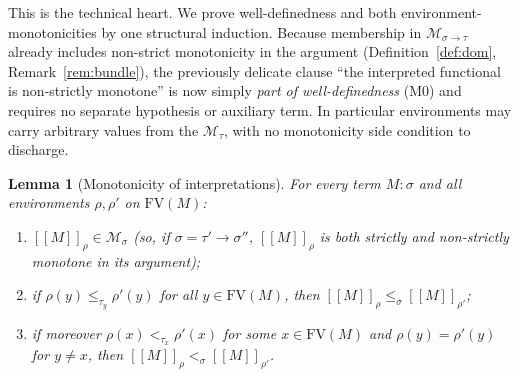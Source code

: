 \documentclass{amsart}
\newtheorem{lemma}{Lemma}
\theoremstyle{definition}
\newcommand{\interp}[1]{[\![#1]\!]}
\newcommand{\FV}{\mathrm{FV}}
\begin{document}
This is the technical heart. We prove well-definedness and both environment-monotonicities
by one structural induction. Because membership in $\mathcal M_{\sigma\to\tau}$ already
includes non-strict monotonicity in the argument (Definition~\ref{def:dom},
Remark~\ref{rem:bundle}), the previously delicate clause ``the interpreted functional is
non-strictly monotone'' is now simply \emph{part of well-definedness} (M0) and requires no
separate hypothesis or auxiliary term. In particular environments may carry arbitrary
values from the $\mathcal M_\tau$, with no monotonicity side condition to discharge.

\begin{lemma}[Monotonicity of interpretations]\label{lem:official}
For every term $M:\sigma$ and all environments $\rho,\rho'$ on $\FV(M)$:
\begin{enumerate}
\item[\textup{(M0)}] $\interp{M}_\rho\in\mathcal M_\sigma$ \emph{(}so, if
  $\sigma=\tau'\to\sigma''$, $\interp{M}_\rho$ is both strictly and non-strictly monotone in
  its argument\emph{)};
\item[\textup{(M$\le$)}] if $\rho(y)\le_{\tau_y}\rho'(y)$ for all $y\in\FV(M)$, then
  $\interp{M}_\rho\le_\sigma\interp{M}_{\rho'}$;
\item[\textup{(M$<$)}] if moreover $\rho(x)<_{\tau_x}\rho'(x)$ for some $x\in\FV(M)$ and
  $\rho(y)=\rho'(y)$ for $y\ne x$, then $\interp{M}_\rho<_\sigma\interp{M}_{\rho'}$.
\end{enumerate}
\end{lemma}
\end{document}
